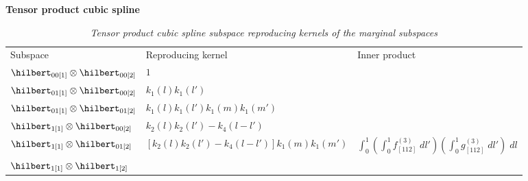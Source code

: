 \begin{example}{\textbf {Tensor product cubic spline}}
\begin{landscape}
\begin{table}[H]
\caption{\textit{Tensor product cubic spline subspace reproducing kernels of the marginal subspaces}} %
\centering %
\begin{tabular}{lll} %
\hline \\
\hline %
Subspace 	& 		Reproducing kernel 		& 	Inner product \\
\hline %
$\hilbert_{00\left[1\right]} \otimes \hilbert_{00\left[2\right]}$ & 	$1$	\\ [1ex] 
$\hilbert_{01\left[1\right]} \otimes \hilbert_{00\left[2\right]} $& 	$k_1\left(l\right)k_1\left(l'\right)$	\\ [1ex] 
$\hilbert_{01\left[1\right]} \otimes \hilbert_{01\left[2\right]}$ & 	$k_1\left(l\right)k_1\left(l'\right)k_1\left(m\right)k_1\left(m'\right)$ \\ [1ex] 
$\hilbert_{1\left[1\right]} \otimes \hilbert_{00\left[2\right]}$  	& 	$k_2\left(l\right)k_2\left(l'\right) - k_4\left(l - l'\right)$	\\ [1ex] 
$\hilbert_{1\left[1\right]} \otimes \hilbert_{01\left[2\right]}$ 	& 	$\left[k_2\left(l\right)k_2\left(l'\right) - k_4\left(l - l'\right)\right]k_1\left(m\right)k_1\left(m'\right)$ & $\int_0^1 \left( \int_0^1 f^{\left(3\right)}_{\left[112\right]}\;dl' \right) \left(  \int_0^1 g^{\left(3\right)}_{\left[112\right]} \;dl'\right)\;dl$ \\ [1ex]  
$\hilbert_{1\left[1\right]} \otimes \hilbert_{1\left[2\right]}$  	\\ [1ex]  
\hline %
\end{tabular}
\label{table:tensor-product-cubic-spline-RK-table}
\end{table}
\end{landscape}
\end{example}

\bigskip

